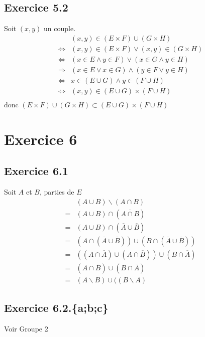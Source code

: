 \documentclass[a4paper,12pt]{article}
\begin{document}
\subsection{Exercice 5.2}
Soit $(x,y)$ un couple.
\[
\begin{aligned}
&(x,y)\in (E \times F) \cup ( G \times H)\\
\Leftrightarrow&(x, y) \in (E \times F) \vee (x,y) \in (G \times H)\\
\Leftrightarrow&(x \in E \wedge y \in F) \vee (x \in G \wedge y \in H) \\
\Rightarrow&(x \in E \vee x \in G) \wedge (y \in F \vee y \in H) \\
\Leftrightarrow&x\in (E \cup G) \wedge y \in (F \cup H)\\
\Leftrightarrow&(x,y)\in (E \cup G) \times (F \cup H)\\
\end{aligned}
\]
donc  $(E \times F) \cup ( G \times H) \subset  (E \cup G) \times (F \cup H)$
\section{Exercice 6}
\subsection{Exercice 6.1}
Soit $A$ et $B$, parties de $E$
\[
\begin{aligned}
&(A \cup B) \backslash (A \cap B)\\
= &(A\cup B)\cap(\overline{A \cap B})\\
= &(A\cup B)\cap(\overline{A} \cup \overline{B})\\
= &(A \cap (\overline{A} \cup \overline{B}))\cup( B\cap (\overline{A} \cup \overline{B}))\\
= &((A \cap \overline{A}) \cup (A \cap \overline{B})) \cup (B \cap \overline{A})\\
= &(A \cap \overline{B}) \cup (B \cap \overline{A})\\
= &(A \backslash B)\cup((B \backslash A)
\end{aligned}
\]
\subsection{Exercice 6.2.\{a;b;c\}}
Voir Groupe 2
\end{document}
